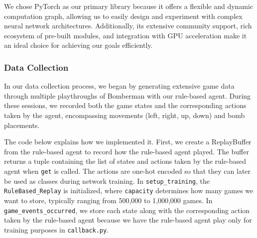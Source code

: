 We chose PyTorch as our primary library because it offers a flexible and dynamic computation graph, allowing us to easily design and 
experiment with complex neural network architectures. Additionally, its extensive community support, rich ecosystem of pre-built modules, 
and integration with GPU acceleration make it an ideal choice for achieving our goals efficiently.

\subsubsection*{Data Collection}

In our data collection process, we began by generating extensive game data through multiple playthroughs of Bomberman with 
our rule-based agent. During these sessions, we recorded both the game states and the corresponding actions taken by the agent, 
encompassing movements (left, right, up, down) and bomb placements.

The code below explains how we implemented it. First, we create a ReplayBuffer from the rule-based agent 
to record how the rule-based agent played. The buffer returns a tuple containing the list of states and actions 
taken by the rule-based agent when \verb|get| is called. The actions are one-hot encoded so that they can later be used as 
classes during network training. In \verb|setup_training|, the \verb|RuleBased_Replay| is initialized, where \verb|capacity| determines 
how many games we want to store, typically ranging from 500,000 to 1,000,000 games. In \verb|game_events_occurred|, 
we store each state along with the corresponding action taken by the rule-based agent because we have the 
rule-based agent play only for training purposes in \verb|callback.py|.

